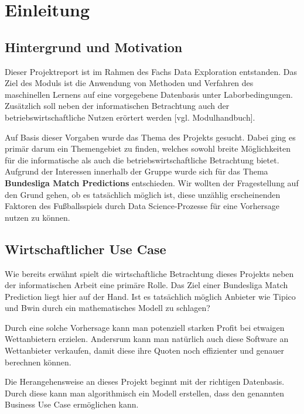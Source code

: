 \chapter{Einleitung}

\section{Hintergrund und Motivation}
Dieser Projektreport ist im Rahmen des Fachs Data Exploration entstanden. Das Ziel des Moduls ist die \glqq Anwendung von Methoden und Verfahren des maschinellen Lernens auf eine vorgegebene Datenbasis unter Laborbedingungen\grqq [Modulhandbuch]. Zusätzlich soll neben der informatischen Betrachtung auch der betriebswirtschaftliche Nutzen erörtert werden [vgl. Modulhandbuch].

Auf Basis dieser Vorgaben wurde das Thema des Projekts gesucht. Dabei ging es primär darum ein Themengebiet zu finden, welches sowohl breite Möglichkeiten für die informatische als auch die betriebswirtschaftliche Betrachtung bietet. Aufgrund der Interessen innerhalb der Gruppe wurde sich für das Thema \textbf{Bundesliga Match Predictions} entschieden. Wir wollten der Fragestellung auf den Grund gehen, ob es tatsächlich möglich ist, diese unzählig erscheinenden Faktoren des Fußballsspiels durch Data Science-Prozesse für eine Vorhersage nutzen zu können.

\section{Wirtschaftlicher Use Case}
Wie bereits erwähnt spielt die wirtschaftliche Betrachtung dieses Projekts neben der informatischen Arbeit eine primäre Rolle. Das Ziel einer Bundesliga Match Prediction liegt hier auf der Hand. Ist es tatsächlich möglich Anbieter wie Tipico und Bwin durch ein mathematisches Modell zu schlagen?

Durch eine solche Vorhersage kann man potenziell starken Profit bei etwaigen Wettanbietern erzielen. Andersrum kann man natürlich auch diese Software an Wettanbieter verkaufen, damit diese ihre Quoten noch effizienter und genauer berechnen können. 

Die Herangehensweise an dieses Projekt beginnt mit der richtigen Datenbasis. Durch diese kann man algorithmisch ein Modell erstellen, dass den genannten Business Use Case ermöglichen kann.